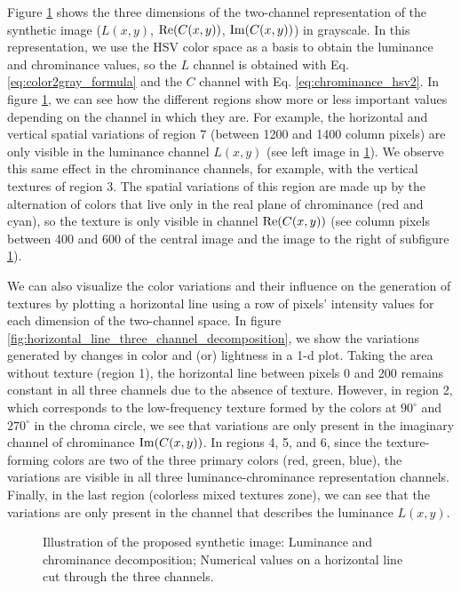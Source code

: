 Figure \ref{fig:three_channel_decomposition} shows the three dimensions of the two-channel representation of the synthetic image ($L(x,y)$, $\mathrm{Re}(C(x,y))$, $\mathrm{Im}(C(x,y))$) in grayscale. In this representation, we use the HSV color space as a basis to obtain the luminance and chrominance values, so the $L$ channel is obtained with Eq. \eqref{eq:color2gray_formula} and the $C$ channel with Eq. \eqref{eq:chrominance_hsv2}. In figure \ref{fig:three_channel_decomposition}, we can see how the different regions show more or less important values depending on the channel in which they are. For example, the horizontal and vertical spatial variations of region 7 (between 1200 and 1400 column pixels) are only visible in the luminance channel $L(x,y)$ (see left image in \ref{fig:three_channel_decomposition}). We observe this same effect in the chrominance channels, for example, with the vertical textures of region 3. The spatial variations of this region are made up by the alternation of colors that live only in the real plane of chrominance (red and cyan), so the texture is only visible in channel $\mathrm{Re}(C(x,y))$ (see column pixels between 400 and 600 of the central image and the image to the right of subfigure \ref{fig:three_channel_decomposition}). 

We can also visualize the color variations and their influence on the generation of textures by plotting a horizontal line using a row of pixels' intensity values for each dimension of the two-channel space. In figure \ref{fig:horizontal_line_three_channel_decomposition}, we show the variations generated by changes in color and (or) lightness in a 1-d plot. Taking the area without texture (region 1), the horizontal line between pixels 0 and 200 remains constant in all three channels due to the absence of texture. However, in region 2, which corresponds to the low-frequency texture formed by the colors at $90^\circ$ and $270^\circ$ in the chroma circle, we see that variations are only present in the imaginary channel of chrominance $\mathrm{Im}(C(x,y))$. In regions 4, 5, and 6, since the texture-forming colors are two of the three primary colors (red, green, blue), the variations are visible in all three luminance-chrominance representation channels. Finally, in the last region (colorless mixed textures zone), we can see that the variations are only present in the channel that describes the luminance $L(x,y)$.

\begin{figure}[!ht]
\centering
\caption{Illustration of the proposed synthetic image:  Luminance and chrominance decomposition;  Numerical values on a horizontal line cut through the three channels.}\label{fig:three_channel_decomposition}
\end{figure}


